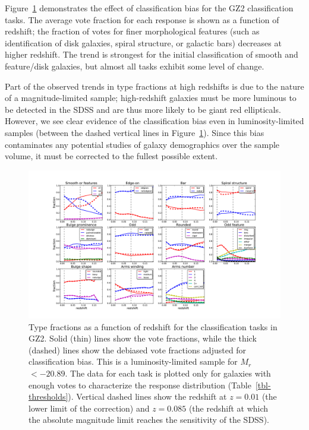 \documentclass[useAMS,usenatbib]{mn2e}
\newcommand{\mr}{$M_r$}
\begin{document}
Figure~\ref{fig-type_fractions} demonstrates the effect of classification bias for the GZ2 classification tasks. The average vote fraction for each response is shown as a function of redshift; the fraction of votes for finer morphological features (such as identification of disk galaxies, spiral structure, or galactic bars) decreases at higher redshift. The trend is strongest for the initial classification of smooth and feature/disk galaxies, but almost all tasks exhibit some level of change. 

Part of the observed trends in type fractions at high redshifts is due to the nature of a magnitude-limited sample; high-redshift galaxies must be more luminous to be detected in the SDSS and are thus more likely to be giant red ellipticals. However, we see clear evidence of the classification bias even in luminosity-limited samples (between the dashed vertical lines in Figure~\ref{fig-type_fractions}). Since this bias contaminates any potential studies of galaxy demographics over the sample volume, it must be corrected to the fullest possible extent. 

\begin{figure}
\includegraphics[angle=0,width=7.0in]{figures/gz2_type_fractions.pdf}
\caption{Type fractions as a function of redshift for the classification tasks in GZ2. Solid (thin) lines show the vote fractions, while the thick (dashed) lines show the debiased vote fractions adjusted for classification bias. This is a luminosity-limited sample for \mr~$<-20.89$. The data for each task is plotted only for galaxies with enough votes to characterize the response distribution (Table~\ref{tbl-thresholds}). Vertical dashed lines show the redshift at $z=0.01$ (the lower limit of the correction) and $z=0.085$ (the redshift at which the absolute magnitude limit reaches the sensitivity of the SDSS). 
\label{fig-type_fractions}}
\end{figure}
\end{document}
